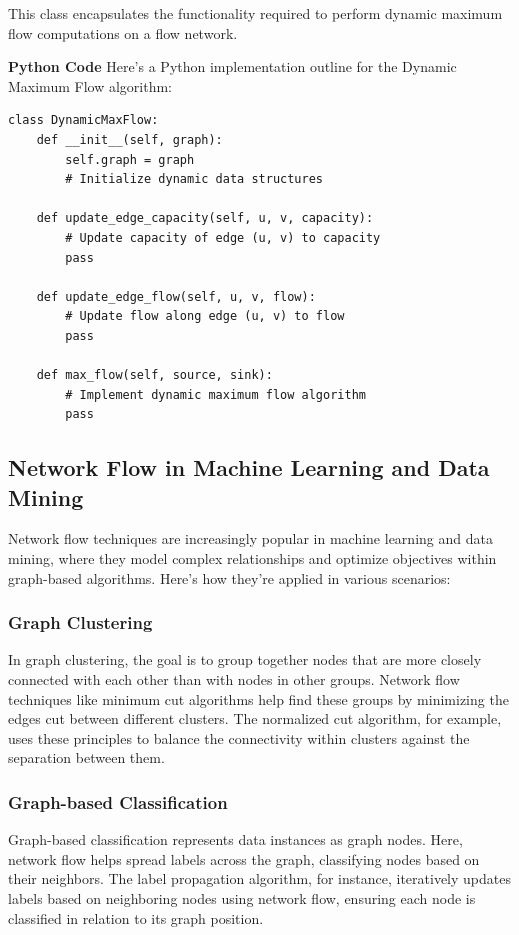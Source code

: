 \documentclass[12pt]{book} %
\begin{document}
This class encapsulates the functionality required to perform dynamic maximum flow computations on a flow network.


\textbf{Python Code}
Here's a Python implementation outline for the Dynamic Maximum Flow algorithm:
\FloatBarrier
\begin{lstlisting}
class DynamicMaxFlow:
    def __init__(self, graph):
        self.graph = graph
        # Initialize dynamic data structures

    def update_edge_capacity(self, u, v, capacity):
        # Update capacity of edge (u, v) to capacity
        pass

    def update_edge_flow(self, u, v, flow):
        # Update flow along edge (u, v) to flow
        pass

    def max_flow(self, source, sink):
        # Implement dynamic maximum flow algorithm
        pass
\end{lstlisting}
\FloatBarrier

\subsection{Network Flow in Machine Learning and Data Mining}

Network flow techniques are increasingly popular in machine learning and data mining, where they model complex relationships and optimize objectives within graph-based algorithms. Here's how they're applied in various scenarios:

\subsubsection{Graph Clustering}

In graph clustering, the goal is to group together nodes that are more closely connected with each other than with nodes in other groups. Network flow techniques like minimum cut algorithms help find these groups by minimizing the edges cut between different clusters. The normalized cut algorithm, for example, uses these principles to balance the connectivity within clusters against the separation between them.

\subsubsection{Graph-based Classification}

Graph-based classification represents data instances as graph nodes. Here, network flow helps spread labels across the graph, classifying nodes based on their neighbors. The label propagation algorithm, for instance, iteratively updates labels based on neighboring nodes using network flow, ensuring each node is classified in relation to its graph position.
\end{document}

